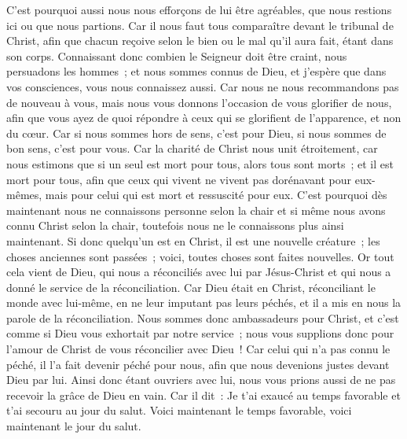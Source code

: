 \begin{multicols}{2}
C'est pourquoi aussi nous nous efforçons de lui être agréables, que nous restions ici ou que nous partions.
Car il nous faut tous comparaître devant le tribunal de Christ, afin que chacun reçoive selon le bien ou le mal qu'il aura fait, étant dans son corps.
Connaissant donc combien le Seigneur doit être craint, nous persuadons les hommes~; et nous sommes connus de Dieu, et j'espère que dans vos consciences, vous nous connaissez aussi.
Car nous ne nous recommandons pas de nouveau à vous, mais nous vous donnons l'occasion de vous glorifier de nous, afin que vous ayez de quoi répondre à ceux qui se glorifient de l'apparence, et non du cœur.
Car si nous sommes hors de sens, c'est pour Dieu, si nous sommes de bon sens, c'est pour vous.
Car la charité de Christ nous unit étroitement, car nous estimons que si un seul est mort pour tous, alors tous sont morts~;
et il est mort pour tous, afin que ceux qui vivent ne vivent pas dorénavant pour eux-mêmes, mais pour celui qui est mort et ressuscité pour eux.
C'est pourquoi dès maintenant nous ne connaissons personne selon la chair et si même nous avons connu Christ selon la chair, toutefois nous ne le connaissons plus ainsi maintenant.
Si donc quelqu'un est en Christ, il est une nouvelle créature~; les choses anciennes sont passées~; voici, toutes choses sont faites nouvelles.
Or tout cela vient de Dieu, qui nous a réconciliés avec lui par Jésus-Christ et qui nous a donné le service de la réconciliation.
Car Dieu était en Christ, réconciliant le monde avec lui-même, en ne leur imputant pas leurs péchés, et il a mis en nous la parole de la réconciliation.
Nous sommes donc ambassadeurs pour Christ, et c'est comme si Dieu vous exhortait par notre service~; nous vous supplions donc pour l'amour de Christ de vous réconcilier avec Dieu~!
Car celui qui n'a pas connu le péché, il l'a fait devenir péché pour nous, afin que nous devenions justes devant Dieu par lui.
\VerseOne{}Ainsi donc étant ouvriers avec lui, nous vous prions aussi de ne pas recevoir la grâce de Dieu en vain.
Car il dit~: Je t'ai exaucé au temps favorable et t'ai secouru au jour du salut. Voici maintenant le temps favorable, voici maintenant le jour du salut.

\end{multicols}
